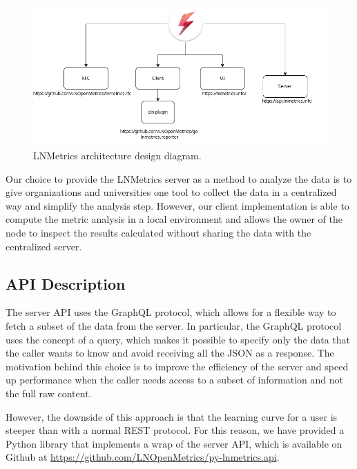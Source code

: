 \begin{figure}
    \begin{center}
    \includegraphics[scale=0.5]{imgs/lnmetrics-architecture.drawio.png}
    \end{center}
   \caption{LNMetrics architecture design diagram.}
    \label{fig:lnmetrics_architecture}
\end{figure}

Our choice to provide the LNMetrics server as a method to analyze the data 
is to give organizations and universities one tool to collect the data in 
a centralized way and simplify the analysis step. However, our client
implementation is able to compute the metric analysis in a local environment 
and allows the owner of the node to inspect the results calculated without 
sharing the data with the centralized server.

\subsection{API Description}

The server API uses the GraphQL protocol, which allows for a flexible way 
to fetch a subset of the data from the server. In particular, the GraphQL 
protocol uses the concept of a query, which makes it possible to specify 
only the data that the caller wants to know and avoid receiving all the JSON 
as a response. The motivation behind this choice is to improve the efficiency 
of the server and speed up performance when the caller needs access to a subset
of information and not the full raw content.

However, the downside of this approach is that the learning curve for a user 
is steeper than with a normal REST protocol. For this reason, we have provided
a Python library that implements a wrap of the server API, which is available
on Github at \url{https://github.com/LNOpenMetrics/py-lnmetrics.api}.


